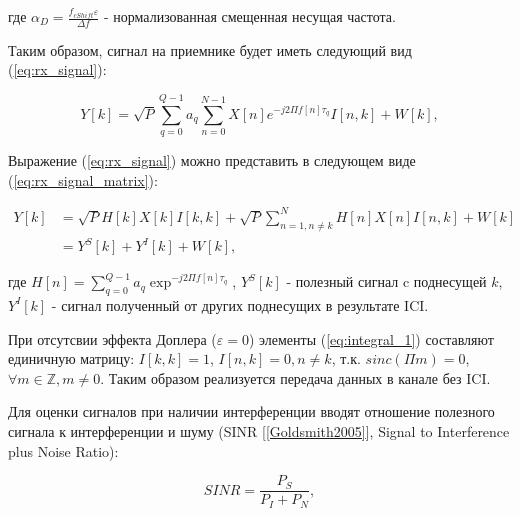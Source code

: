 \noindent где $\alpha_{D} = \frac{f_{cShift} \varepsilon}{\Delta f}$ - нормализованная смещенная несущая частота.

\noindent Таким образом, сигнал на приемнике будет иметь следующий вид (\ref{eq:rx_signal}):

\begin{equation}
    Y[k] = \sqrt{P} \sum_{q = 0}^{Q - 1} a_q \sum_{n = 0}^{N-1} X[n] e^{-j2 \Pi f[n]\tau_q} I[n, k] + W[k],
    \label{eq:rx_signal}
\end{equation}

\noindent Выражение (\ref{eq:rx_signal}) можно представить в следующем виде (\ref{eq:rx_signal_matrix}):

\begin{equation}
    \label{eq:rx_signal_matrix}
    \begin{split}
    Y[k] &= \sqrt{P} H[k] X[k] I[k, k] + \sqrt{P} \sum_{n = 1, n \neq k}^{N} H[n] X[n] I[n, k] + W[k] \\
         &= Y^S[k] + Y^I[k] + W[k],
    \end{split}
\end{equation}

\noindent где $H[n] = \sum_{q = 0}^{Q - 1} a_q \exp^{-j2 \Pi f[n]\tau_q}$,
$Y^S[k]$ - полезный сигнал c поднесущей $k$, $Y^I[k]$ 
- сигнал полученный от других поднесущих в результате ICI.

При отсутсвии эффекта Доплера ($\varepsilon = 0$)
элементы (\ref{eq:integral_1}) составляют единичную матрицу: $I[k, k] = 1$,
$I[n, k] = 0, n \neq k$, т.к.
$sinc(\Pi m) = 0$, $\forall m \in \mathbb{Z}, m \neq 0$. Таким образом реализуется передача данных в
канале без ICI.

Для оценки сигналов при наличии интерференции вводят отношение полезного сигнала к интерференции и шуму
(SINR [\ref{Goldsmith2005}], Signal to Interference plus Noise Ratio):

\begin{equation}
    SINR = \frac{P_{S}}{P_{I} + P_{N}},
    \label{eq:sinr}
\end{equation}

